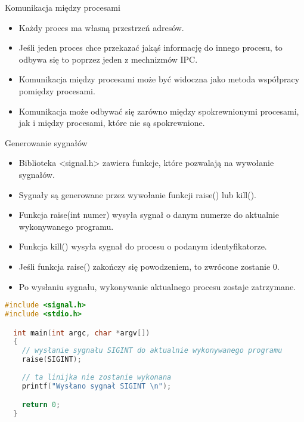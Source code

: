 \documentclass[notheorems, aspectratio=54]{beamer}
\begin{document}
\begin{frame}

Komunikacja między procesami
\begin{itemize}
  \item Każdy proces ma własną przestrzeń adresów.
  \item Jeśli jeden proces chce przekazać jakąś informację do innego procesu, to odbywa się to poprzez jeden z mechnizmów IPC.
  \item Komunikacja między procesami może być widoczna jako metoda współpracy pomiędzy procesami.
  \item Komunikacja może odbywać się zarówno między spokrewnionymi procesami, jak i między procesami, które nie są spokrewnione.
\end{itemize}

\end{frame}

\begin{frame}

Generowanie sygnałów

\begin{itemize}
  \item Biblioteka <signal.h> zawiera funkcje, które pozwalają na wywołanie sygnałów.
  \item Sygnały są generowane przez wywołanie funkcji raise() lub kill().
  \item Funkcja raise(int numer) wysyła sygnał o danym numerze do aktualnie wykonywanego programu.
  \item Funkcja kill() wysyła sygnał do procesu o podanym identyfikatorze.
  \item Jeśli funkcja raise() zakończy się powodzeniem, to zwrócone zostanie 0.
  \item Po wysłaniu sygnału, wykonywanie aktualnego procesu zostaje zatrzymane.
\end{itemize}  

\begin{lstlisting}[language=C++]
#include <signal.h>
#include <stdio.h>

  int main(int argc, char *argv[])
  {
    // wysłanie sygnału SIGINT do aktualnie wykonywanego programu
    raise(SIGINT);
   
    // ta linijka nie zostanie wykonana
    printf("Wysłano sygnał SIGINT \n");

    return 0;
  }
\end{lstlisting}

\end{frame}
\end{document}
